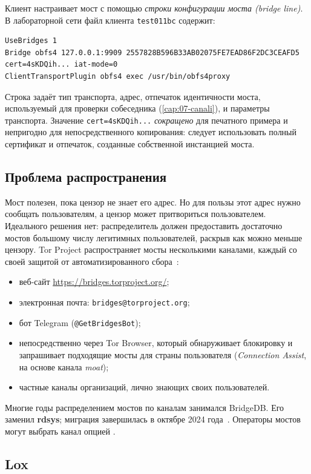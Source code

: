 Клиент настраивает мост с помощью \emph{строки конфигурации моста (bridge line)}. В лабораторной сети файл  клиента \texttt{test011bc} содержит:
\begin{lstlisting}[language=torrc,numbers=none]
UseBridges 1
Bridge obfs4 127.0.0.1:9909 2557828B596B33AB02075FE7EAD86F2DC3CEAFD5 cert=4sKDQih... iat-mode=0
ClientTransportPlugin obfs4 exec /usr/bin/obfs4proxy
\end{lstlisting}
Строка задаёт тип транспорта, адрес, отпечаток идентичности моста, используемый для проверки собеседника (\cref{cap:07-canali}), и параметры транспорта. Значение \texttt{cert=4sKDQih...} \emph{сокращено} для печатного примера и непригодно для непосредственного копирования: следует использовать полный сертификат и отпечаток, созданные собственной инстанцией моста.

\subsection{Проблема распространения}

Мост полезен, пока цензор не знает его адрес. Но для пользы этот адрес нужно сообщать пользователям, а цензор может притвориться пользователем. Идеального решения нет: распределитель должен предоставить достаточно мостов большому числу легитимных пользователей, раскрыв как можно меньше цензору. Tor Project распространяет мосты несколькими каналами, каждый со своей защитой от автоматизированного сбора~\cite{torsupport}:
\begin{itemize}
  \item веб-сайт \url{https://bridges.torproject.org/};
  \item электронная почта: \texttt{bridges@torproject.org};
  \item бот Telegram (\texttt{@GetBridgesBot});
  \item непосредственно через Tor Browser, который обнаруживает блокировку и запрашивает подходящие мосты для страны пользователя (\emph{Connection Assist}, на основе канала \emph{moat});
  \item частные каналы организаций, лично знающих своих пользователей.
\end{itemize}
Многие годы распределением мостов по каналам занимался BridgeDB. Его заменил \textbf{rdsys}; миграция завершилась в октябре 2024 года~\cite{torblogrdsys}. Операторы мостов могут выбрать канал опцией .

\subsection{Lox}

